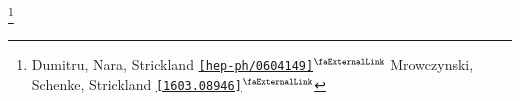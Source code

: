 \documentclass[aspectratio=169,11pt,usenames,dvipsnames]{beamer}
\renewcommand{\thefootnote}{\color{customblue}\faPaperPlaneO}
\newcommand\blfootnote[1]{%
  \begingroup
  \renewcommand\thefootnote{}\footnote{#1}%
  \addtocounter{footnote}{-1}%
  \endgroup
}
\begin{document}
\begin{frame}

    \blfootnote{\scriptsize Dumitru, Nara, Strickland \href{https://arxiv.org/abs/hep-ph/0604149}{{\color{palgold}\texttt{[hep-ph/0604149]}$^\text{\scalebox{0.9}{\faExternalLink}}$}} Mrowczynski, Schenke, Strickland \href{https://arxiv.org/abs/1603.08946}{{\color{palgold}\texttt{[1603.08946]}$^\text{\scalebox{0.9}{\faExternalLink}}$}}}
\end{frame}


\end{document}
